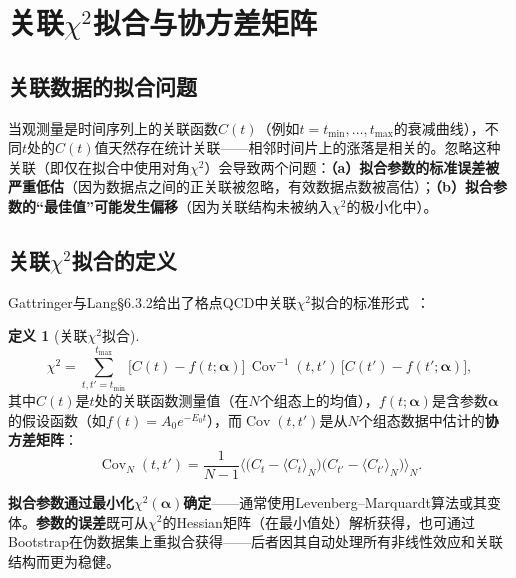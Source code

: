 \documentclass[12pt,a4paper]{ctexart}
\theoremstyle{definition}
\newtheorem{definition}{定义}[section]
\begin{document}
\section{关联$\chi^2$拟合与协方差矩阵}

\subsection{关联数据的拟合问题}

当观测量是时间序列上的关联函数$C(t)$（例如$t = t_{\min}, \dots, t_{\max}$的衰减曲线），不同$t$处的$C(t)$值天然存在统计关联——相邻时间片上的涨落是相关的。忽略这种关联（即仅在拟合中使用对角$\chi^2$）会导致两个问题：\textbf{（a）拟合参数的标准误差被严重低估}（因为数据点之间的正关联被忽略，有效数据点数被高估）；\textbf{（b）拟合参数的``最佳值''可能发生偏移}（因为关联结构未被纳入$\chi^2$的极小化中）。

\subsection{关联$\chi^2$拟合的定义}

Gattringer与Lang§6.3.2给出了格点QCD中关联$\chi^2$拟合的标准形式~\cite{GattringerLang2010}：

\begin{definition}[关联$\chi^2$拟合]
\begin{equation}
\boxed{\chi^2 = \sum_{t,t' = t_{\min}}^{t_{\max}} \big[ C(t) - f(t; \boldsymbol\alpha) \big] \, \operatorname{Cov}^{-1}(t, t') \, \big[ C(t') - f(t'; \boldsymbol\alpha) \big]},
\label{eq:correlated_chisq}
\end{equation}
其中$C(t)$是$t$处的关联函数测量值（在$N$个组态上的均值），$f(t; \boldsymbol\alpha)$是含参数$\boldsymbol\alpha$的假设函数（如$f(t) = A_0 e^{-E_0 t}$），而$\operatorname{Cov}(t,t')$是从$N$个组态数据中估计的\textbf{协方差矩阵}：
\begin{equation}
\operatorname{Cov}_N(t, t') = \frac{1}{N-1} \Big\langle \big( C_t - \langle C_t\rangle_N \big) \big( C_{t'} - \langle C_{t'}\rangle_N \big) \Big\rangle_N.
\label{eq:covariance_matrix}
\end{equation}
\end{definition}

\textbf{拟合参数通过最小化$\chi^2(\boldsymbol\alpha)$确定}——通常使用Levenberg--Marquardt算法或其变体。\textbf{参数的误差}既可从$\chi^2$的Hessian矩阵（在最小值处）解析获得，也可通过Bootstrap在伪数据集上重拟合获得——后者因其自动处理所有非线性效应和关联结构而更为稳健。
\end{document}
